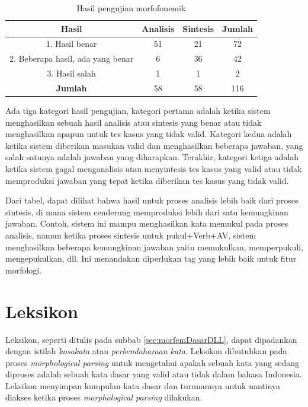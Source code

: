 \begin{table}[H]
\centering
\begin{tabular}{|c|c|c|c|}
\hline
\textbf{Hasil} & \textbf{Analisis} & \textbf{Sintesis} & \textbf{Jumlah} \\
\hline
1. Hasil benar & 51 & 21 & 72 \\
\hline
2. Beberapa hasil, ada yang benar & 6 & 36 & 42 \\
\hline
3. Hasil salah & 1 & 1 & 2 \\
\hline
\textbf{Jumlah} & 58 & 58 & 116 \\
\hline
\end{tabular}
\caption{Hasil pengujian morfofonemik\cite{manurung:08:indonesian}}
\label{tabel-hasil-pengujian-morfofonemik}
\end{table}

Ada tiga kategori hasil pengujian, kategori pertama adalah ketika sistem menghasilkan sebuah hasil analisis atau sintesis yang benar atau tidak menghasilkan apapun untuk tes kasus yang tidak valid. Kategori kedua adalah ketika sistem diberikan masukan valid dan menghasilkan beberapa jawaban, yang salah satunya adalah jawaban yang diharapkan. Terakhir, kategori ketiga adalah ketika sistem gagal menganalisis atau menyintesis tes kasus yang valid atau tidak memproduksi jawaban yang tepat ketika diberikan tes kasus yang tidak valid.

Dari tabel, dapat dilihat bahwa hasil untuk proses analisis lebih baik dari proses sintesis, di mana sistem cenderung memproduksi lebih dari satu kemungkinan jawaban. Contoh, sistem ini mampu menghasilkan kata memukul pada proses analisis, namun ketika proses sintesis untuk pukul+Verb+AV, sistem menghasilkan beberapa kemungkinan jawaban yaitu memukulkan, memperpukuli, mengepukulkan, dll. Ini menandakan diperlukan tag yang lebih baik untuk fitur morfologi.

\section{Leksikon}
\label{sec:leksikon}
Leksikon, seperti ditulis pada subbab \ref{sec:morfemDasarDLL}, dapat dipadankan dengan istilah \textit{kosakata} atau \textit{perbendaharaan kata}. Leksikon dibutuhkan pada proses \textit{morphological parsing} untuk mengetahui apakah sebuah kata yang sedang diproses adalah sebuah kata dasar yang valid atau tidak dalam bahasa Indonesia. Leksikon menyimpan kumpulan kata dasar dan turunannya untuk nantinya diakses ketika proses \textit{morphological parsing} dilakukan.

